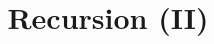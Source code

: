 \documentclass{article}
\begin{document}
\title{Recursion (II)}
\author{}
\date{}

\maketitle


\end{document}
